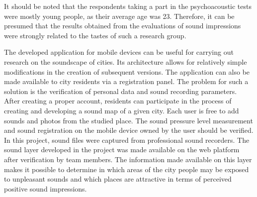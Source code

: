 \documentclass[a4paper,10pt]{article}
\begin{document}
\begin{multicols}{2}
  It should be noted that the respondents taking a part in the psychoacoustic
  tests were mostly young people, as their average age was 23. Therefore, it can
  be presumed that the results obtained from the evaluations of sound
  impressions were strongly related to the tastes of such a research group.

  The developed application for mobile devices can be useful for carrying out
  research on the soundscape of cities. Its architecture allows for relatively
  simple modifications in the creation of subsequent versions. The application
  can also be made available to city residents via a registration panel. The
  problem for such a solution is the verification of personal data and sound
  recording parameters. After creating a proper account, residents can
  participate in the process of creating and developing a sound map of a given
  city. Each user is free to add sounds and photos from the studied place. The
  sound pressure level measurement and sound registration on the mobile device
  owned by the user should be verified. In this project, sound files were
  captured from professional sound recorders. The sound layer developed in the
  project was made available on the web platform after verification by team
  members. The information made available on this layer makes it possible to
  determine in which areas of the city people may be exposed to unpleasant
  sounds and which places are attractive in terms of perceived positive sound
  impressions.
\end{multicols}

\newpage


\end{document}
